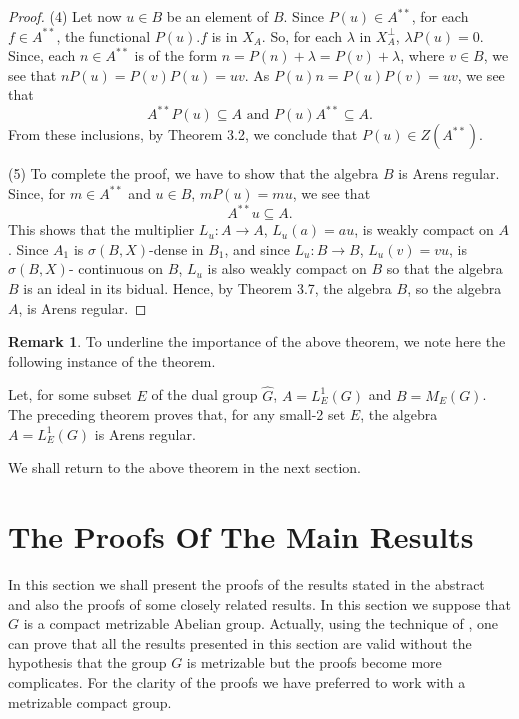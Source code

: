 \documentclass[12pt, twoside, leqno]{article}
\theoremstyle{definition}
\newtheorem{remark}[theorem]{Remark}
\theoremstyle{definition}
\numberwithin{equation}{section}
\begin{document}
\begin{proof}
(4) Let now $u\in B$ be an element of $B$. Since $P(u)\in A^{**}$, for each $f\in A^{**}$, the functional $P(u).f$ is in $X_{A}$. So, for each $\lambda$ in $X_{A}^{\perp}$, $\lambda P(u)=0$. Since, each $n\in A^{**}$ is of the form  $n=P(n)+\lambda=P(v)+\lambda$, where $v\in B$, we see that $nP(u)=P(v)P(u)=uv$. As $P(u)n=P(u)P(v)=uv$, we see that $$A^{**}P(u)\subseteq A \text{ and } P(u)A^{**}\subseteq A.$$ From these inclusions, by Theorem 3.2, we conclude that $P(u)\in Z(A^{**})$.\vspace{2mm}

(5) To complete the proof, we have to show that the algebra $B$ is Arens regular. Since, for $m\in A^{**}$ and $u\in B$, $mP(u)=mu$, we see that $$A^{**}u\subseteq A. $$ This shows that the multiplier $L_{u}:A\rightarrow A$, $L_{u}(a)=au$, is weakly compact on $A$. Since $A_{1}$ is $\sigma(B,X)$-dense in $B_{1}$, and since $L_{u}:B\rightarrow B$, $L_{u}(v)=vu$, is $\sigma(B,X)$- continuous on $B$, $L_{u}$ is also weakly compact on $B$ so that the algebra $B$ is an ideal in its bidual. Hence, by Theorem 3.7, the algebra $B$, so the algebra $A$, is Arens regular.


\end{proof}  
\begin{remark}  To underline the importance of the above theorem, we note here the following instance of the theorem. \vspace{2mm}
	
	Let, for some subset $E$ of the dual group $\hat{G}$, $A=L^{1}_{E}(G)$ and $B=M_{E}(G)$. The preceding theorem proves that, for any small-2 set $E$, the algebra $A=L^{1}_{E}(G)$ is Arens regular.
	
\end{remark}

 We shall return to the above theorem in the next section. 

\section{The Proofs Of The Main Results}
In this section we shall present the proofs of the results stated in the abstract and also the proofs of some closely related results. In this section we suppose that $ G $ is a compact metrizable Abelian group. Actually, using the technique of \cite[Lemma 2.3]{npu}, one can prove that  all the results presented in this section are valid without the hypothesis that the group $ G $ is metrizable but the proofs become more complicates. For the clarity of the proofs we have preferred to work with a metrizable compact group.\vspace{2mm}
\end{document}
